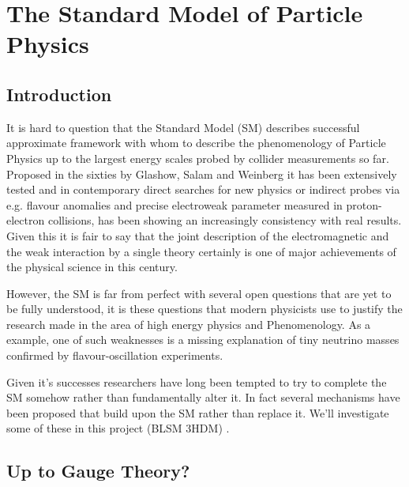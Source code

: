 
\newpage 

\section{The Standard Model of Particle Physics}

\subsection{Introduction}

It is hard to question that the Standard Model (SM) describes successful approximate framework with whom to describe the phenomenology of Particle Physics up to the largest energy scales probed by collider measurements so far. Proposed in the sixties by Glashow, Salam and Weinberg it has been extensively tested and in contemporary direct searches for new physics or indirect probes via e.g. flavour anomalies and precise electroweak parameter measured in proton-electron collisions, has been showing an increasingly consistency with real results.  %
Given this it is fair to say that the joint description of the  electromagnetic and the  weak  interaction  by  a  single  theory  certainly  is  one  of  major  achievements  of the physical science in this century. 

However, the SM  is far from perfect with several open questions that are yet to be fully understood, it is these questions that modern physicists use to justify the research made in the area of high energy physics and Phenomenology. As a example, one of such weaknesses is a missing explanation of tiny neutrino masses confirmed by flavour-oscillation experiments. 

Given it's successes researchers have long been tempted to try to complete the SM somehow rather than fundamentally alter it. In fact several mechanisms have been proposed that build upon the SM rather than replace it. { \color{blue}  We'll investigate some of these in this project (BLSM 3HDM) . } 

\subsection{Up to Gauge Theory?}

